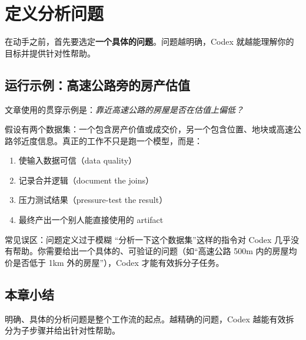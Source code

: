 \section{定义分析问题}

在动手之前，首先要选定\textbf{一个具体的问题}。问题越明确，Codex 就越能理解你的目标并提供针对性帮助。

\subsection{运行示例：高速公路旁的房产估值}

文章使用的贯穿示例是：\textit{靠近高速公路的房屋是否在估值上偏低？}

假设有两个数据集：一个包含房产价值或成交价，另一个包含位置、地块或高速公路邻近度信息。真正的工作不只是跑一个模型，而是：

\begin{enumerate}[nosep]
    \item 使输入数据可信（data quality）
    \item 记录合并逻辑（document the joins）
    \item 压力测试结果（pressure-test the result）
    \item 最终产出一个别人能直接使用的 artifact
\end{enumerate}

\begin{warningbox}{常见误区：问题定义过于模糊}
``分析一下这个数据集''这样的指令对 Codex 几乎没有帮助。你需要给出一个具体的、可验证的问题（如``高速公路 500m 内的房屋均价是否低于 1km 外的房屋''），Codex 才能有效拆分子任务。
\end{warningbox}

\subsection{本章小结}
明确、具体的分析问题是整个工作流的起点。越精确的问题，Codex 越能有效拆分为子步骤并给出针对性帮助。

